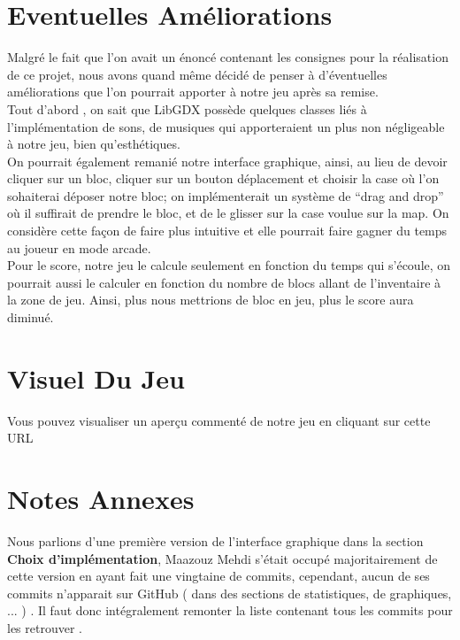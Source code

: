 \documentclass[a4paper,10pt]{article}
\begin{document}
\section{Eventuelles Améliorations}
Malgré le fait que l'on avait un énoncé contenant les consignes pour la réalisation de ce projet, nous avons quand même décidé de penser à d'éventuelles
améliorations que l'on pourrait apporter à notre jeu après sa remise.\\
Tout d'abord , on sait que LibGDX possède quelques classes liés à l'implémentation de sons, de musiques qui apporteraient un plus
non négligeable à notre jeu, bien qu'esthétiques.\\
On pourrait également remanié notre interface graphique, ainsi, au lieu de devoir cliquer sur un bloc, cliquer sur un bouton déplacement
et choisir la case où l'on sohaiterai déposer notre bloc; on implémenterait un système de ``drag and drop'' où il suffirait de prendre le bloc,
et de le glisser sur la case voulue sur la map. On considère cette façon de faire plus intuitive et elle pourrait faire gagner du temps au joueur
en mode arcade.\\
Pour le score, notre jeu le calcule seulement en fonction du temps qui s'écoule, on pourrait aussi le calculer en fonction du nombre de blocs allant
de l'inventaire à la zone de jeu. Ainsi, plus nous mettrions de bloc en jeu, plus le score aura diminué.

\section{Visuel Du Jeu}
Vous pouvez visualiser un aperçu commenté de notre jeu en cliquant sur cette URL

\section{Notes Annexes}
Nous parlions d'une première version de l'interface graphique dans la section \textbf{Choix d'implémentation}, Maazouz Mehdi s'était occupé majoritairement
de cette version en ayant fait une vingtaine de commits, cependant, aucun de ses commits n'apparait sur GitHub ( dans des sections de statistiques, 
de graphiques, ... ) . Il faut donc intégralement remonter la liste contenant tous les commits pour les retrouver .
\end{document}
